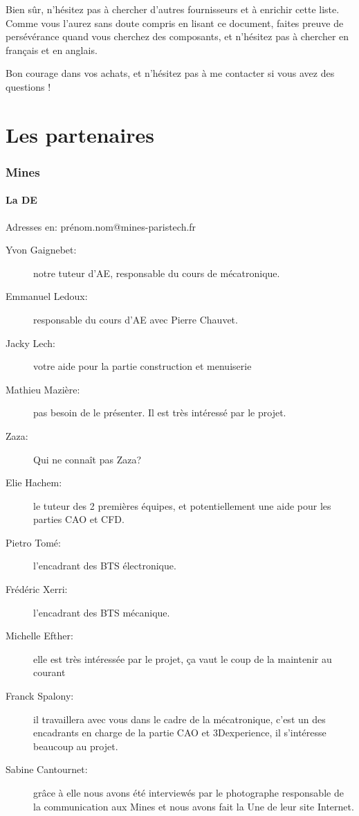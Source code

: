 \documentclass[a4paper, 11pt]{report}
\begin{document}
Bien sûr, n'hésitez pas à chercher d'autres fournisseurs et à enrichir
cette liste. Comme vous l'aurez sans doute compris en lisant ce document,
faites preuve de persévérance quand vous cherchez des composants,
et n'hésitez pas à chercher en français et en anglais. 

Bon courage dans vos achats, et n'hésitez pas à me contacter si vous
avez des questions !


\part{Les partenaires}

\section{Mines}

\subsection{La DE}
Adresses en: prénom.nom@mines-paristech.fr

\begin{description}
\item[Yvon Gaignebet:]notre tuteur d’AE, responsable du cours de mécatronique.
\item[Emmanuel Ledoux:]responsable du cours d’AE avec Pierre Chauvet.
\item[Jacky Lech:]votre aide pour la partie construction et menuiserie
\item[Mathieu Mazière:]pas besoin de le présenter. Il est très intéressé par le projet.
\item[Zaza:]Qui ne connaît pas Zaza?
\item[Elie Hachem:]le tuteur des 2 premières équipes, et potentiellement une aide pour les parties CAO et CFD. 
\item[Pietro Tomé:]l’encadrant des BTS électronique.
\item[Frédéric Xerri:]l’encadrant des BTS mécanique.
\item[Michelle Efther:] elle est très intéressée par le projet, ça vaut le coup de la maintenir au courant
\item[Franck Spalony:]il travaillera avec vous dans le cadre de la mécatronique, c’est un des encadrants en charge de la partie CAO et 3Dexperience, il s’intéresse beaucoup au projet.
\item[Sabine Cantournet:]grâce à elle nous avons été interviewés par le photographe responsable de la communication aux Mines et nous avons fait la Une de leur site Internet.

\end{description}
\end{document}
